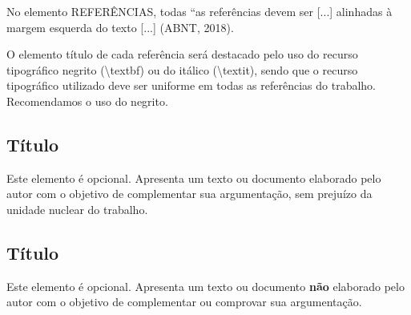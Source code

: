 \documentclass[
  oneside, %
  english,
  brazil
]{abntbibufjf}
\begin{document}
\postextual{}



No elemento REFERÊNCIAS, todas ``as referências devem ser [...] alinhadas à margem esquerda do texto [...] (ABNT, 2018).

O elemento título de cada referência será destacado pelo uso do recurso tipográfico negrito (\textbackslash{}textbf) ou do itálico (\textbackslash{}textit), sendo que o recurso tipográfico utilizado deve ser uniforme em todas as referências do trabalho.
Recomendamos o uso do negrito.








\begin{apendices}
  \chapter{\apendseq{} Título}
  Este elemento é opcional.
  Apresenta um texto ou documento elaborado pelo autor com o objetivo de complementar sua argumentação, sem prejuízo da unidade nuclear do trabalho.
\end{apendices}


\begin{anexos}
  \chapter{\anexoseq{} Título}
  Este elemento é opcional.
  Apresenta um texto ou documento \textbf{não} elaborado pelo autor com o objetivo de complementar ou comprovar sua argumentação.
\end{anexos}



\end{document}
